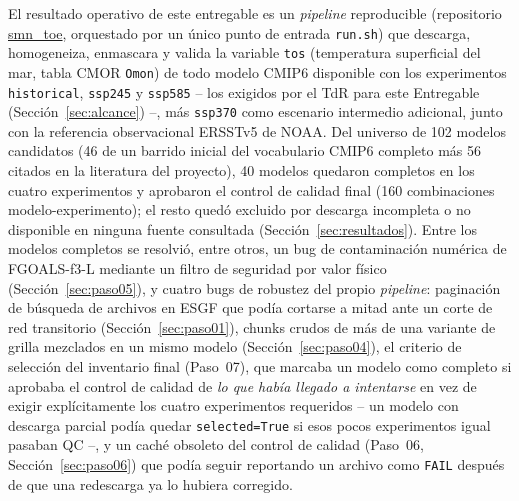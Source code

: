\documentclass[11pt,a4paper]{article}
\newcommand{\archivo}[1]{\begingroup\hypersetup{urlcolor=black}\url{#1}\endgroup}
\begin{document}
El resultado operativo de este entregable es un \emph{pipeline} reproducible (repositorio \archivo{smn_toe}, orquestado por un \'unico punto de entrada \texttt{run.sh}) que descarga, homogeneiza, enmascara y valida la variable \texttt{tos} (temperatura superficial del mar, tabla CMOR \texttt{Omon}) de todo modelo CMIP6 disponible con los experimentos \texttt{historical}, \texttt{ssp245} y \texttt{ssp585} -- los exigidos por el TdR para este Entregable (Secci\'on~\ref{sec:alcance}) --, m\'as \texttt{ssp370} como escenario intermedio adicional, junto con la referencia observacional ERSSTv5 de NOAA. Del universo de 102 modelos candidatos (46 de un barrido inicial del vocabulario CMIP6 completo m\'as 56 citados en la literatura del proyecto), 40 modelos quedaron completos en los cuatro experimentos y aprobaron el control de calidad final (160 combinaciones modelo-experimento); el resto qued\'o excluido por descarga incompleta o no disponible en ninguna fuente consultada (Secci\'on~\ref{sec:resultados}). Entre los modelos completos se resolvi\'o, entre otros, un bug de contaminaci\'on num\'erica de FGOALS-f3-L mediante un filtro de seguridad por valor f\'isico (Secci\'on~\ref{sec:paso05}), y cuatro bugs de robustez del propio \emph{pipeline}: paginaci\'on de b\'usqueda de archivos en ESGF que pod\'ia cortarse a mitad ante un corte de red transitorio (Secci\'on~\ref{sec:paso01}), chunks crudos de m\'as de una variante de grilla mezclados en un mismo modelo (Secci\'on~\ref{sec:paso04}), el criterio de selecci\'on del inventario final (Paso~07), que marcaba un modelo como completo si aprobaba el control de calidad de \emph{lo que hab\'ia llegado a intentarse} en vez de exigir expl\'icitamente los cuatro experimentos requeridos -- un modelo con descarga parcial pod\'ia quedar \texttt{selected=True} si esos pocos experimentos igual pasaban QC --, y un cach\'e obsoleto del control de calidad (Paso~06, Secci\'on~\ref{sec:paso06}) que pod\'ia seguir reportando un archivo como \texttt{FAIL} despu\'es de que una redescarga ya lo hubiera corregido.
\end{document}
